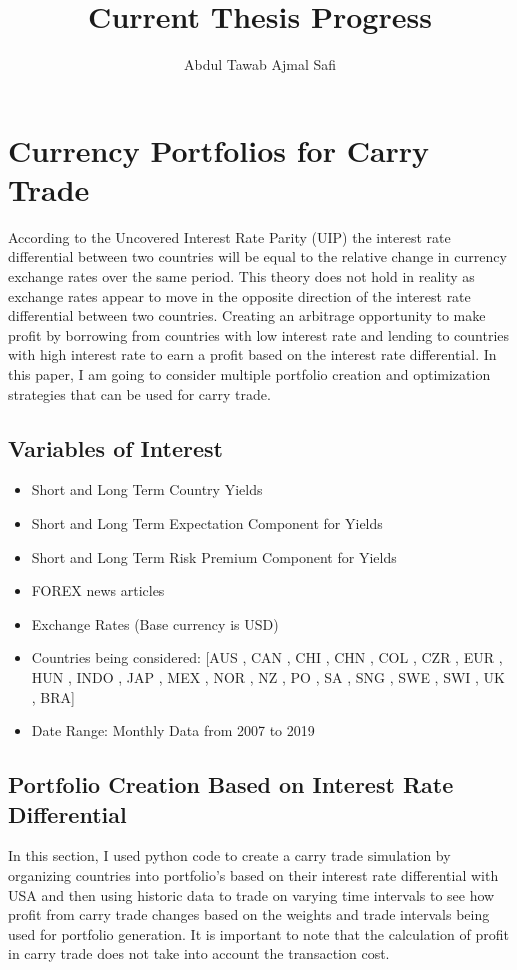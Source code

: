 \documentclass{article}
\begin{document}
\title{Current Thesis Progress}
\author{Abdul Tawab Ajmal Safi}

\maketitle


\section{Currency Portfolios for Carry Trade}
According to the Uncovered Interest Rate Parity (UIP) the interest rate differential between two countries
will be equal to the relative change in currency exchange rates over the same period. This theory does not hold in reality
as exchange rates appear to move in the opposite direction of the interest rate differential between two countries. Creating an
arbitrage opportunity to make profit by borrowing from countries with low interest rate and lending to countries with high
interest rate to earn a profit based on the interest rate differential. In this paper, I am going to consider multiple portfolio creation
and optimization strategies that can be used for carry trade.


\subsection{Variables of Interest}
\begin{itemize}
  \item Short and Long Term Country Yields
  \item Short and Long Term Expectation Component for Yields
  \item Short and Long Term Risk Premium Component for Yields
  \item FOREX news articles
  \item Exchange Rates (Base currency is USD)
  \item Countries being considered: [AUS ,  CAN ,  CHI ,  CHN ,  COL ,  CZR ,  EUR ,  HUN ,
                       INDO ,  JAP ,  MEX ,  NOR ,  NZ ,  PO , SA ,  SNG , SWE ,  SWI ,  UK  , BRA]
  \item Date Range: Monthly Data from 2007 to 2019
\end{itemize}

\newpage

\subsection{Portfolio Creation Based on Interest Rate Differential}
In this section, I used python code to create a carry trade simulation by organizing countries into portfolio's
based on their interest rate differential with USA and then using historic data to trade on varying time intervals
to see how profit from carry trade changes based on the weights and trade intervals being used for portfolio generation.
It is important to note that the calculation of profit in carry trade does not take into account the transaction cost.
\end{document}
